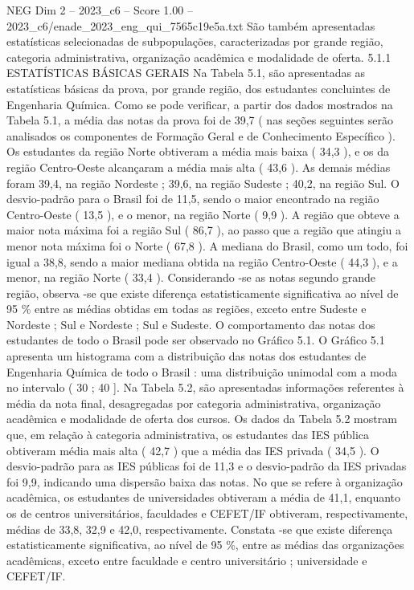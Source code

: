 \begin{textsample}{NEG Dim 2 – 2023\_c6 – Score 1.00 – 2023\_c6/enade\_2023\_eng\_qui\_7565c19e5a.txt}
São também apresentadas estatísticas selecionadas de subpopulações, caracterizadas por grande região, categoria administrativa, organização acadêmica e modalidade de oferta. 5.1.1 ESTATÍSTICAS BÁSICAS GERAIS Na Tabela 5.1, são apresentadas as estatísticas básicas da prova, por grande região, dos estudantes concluintes de Engenharia Química.
Como se pode verificar, a partir dos dados mostrados na Tabela 5.1, a média das notas da prova foi de 39,7 ( nas seções seguintes serão analisados os componentes de Formação Geral e de Conhecimento Específico ).
Os estudantes da região Norte obtiveram a média mais baixa ( 34,3 ), e os da região Centro-Oeste alcançaram a média mais alta ( 43,6 ).
As demais médias foram 39,4, na região Nordeste ; 39,6, na região Sudeste ; 40,2, na região Sul.
O desvio-padrão para o Brasil foi de 11,5, sendo o maior encontrado na região Centro-Oeste ( 13,5 ), e o menor, na região Norte ( 9,9 ).
A região que obteve a maior nota máxima foi a região Sul ( 86,7 ), ao passo que a região que atingiu a menor nota máxima foi o Norte ( 67,8 ).
A mediana do Brasil, como um todo, foi igual a 38,8, sendo a maior mediana obtida na região Centro-Oeste ( 44,3 ), e a menor, na região Norte ( 33,4 ).
Considerando -se as notas segundo grande região, observa -se que existe diferença estatisticamente significativa ao nível de 95 \% entre as médias obtidas em todas as regiões, exceto entre Sudeste e Nordeste ; Sul e Nordeste ; Sul e Sudeste.
O comportamento das notas dos estudantes de todo o Brasil pode ser observado no Gráfico 5.1.
O Gráfico 5.1 apresenta um histograma com a distribuição das notas dos estudantes de Engenharia Química de todo o Brasil : uma distribuição unimodal com a moda no intervalo ( 30 ; 40 ].
Na Tabela 5.2, são apresentadas informações referentes à média da nota final, desagregadas por categoria administrativa, organização acadêmica e modalidade de oferta dos cursos.
Os dados da Tabela 5.2 mostram que, em relação à categoria administrativa, os estudantes das IES pública obtiveram média mais alta ( 42,7 ) que a média das IES privada ( 34,5 ).
O desvio-padrão para as IES públicas foi de 11,3 e o desvio-padrão da IES privadas foi 9,9, indicando uma dispersão baixa das notas.
No que se refere à organização acadêmica, os estudantes de universidades obtiveram a média de 41,1, enquanto os de centros universitários, faculdades e CEFET/IF obtiveram, respectivamente, médias de 33,8, 32,9 e 42,0, respectivamente.
Constata -se que existe diferença estatisticamente significativa, ao nível de 95 \%, entre as médias das organizações acadêmicas, exceto entre faculdade e centro universitário ; universidade e CEFET/IF.

\end{textsample}
